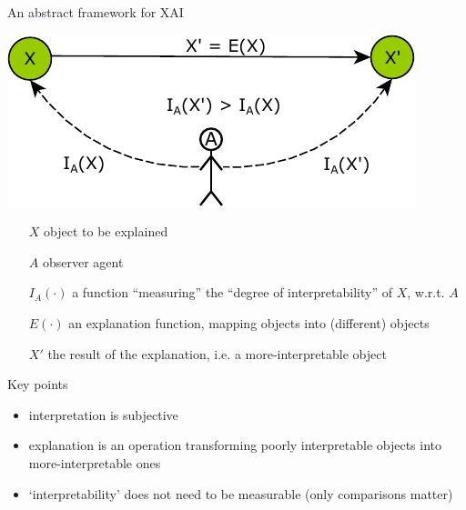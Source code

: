 \documentclass[presentation]{beamer}\mode<presentation>{\usetheme{AMSBolognaFC}}
\begin{document}
\begin{frame}[allowframebreaks]{An abstract framework for XAI}

    \begin{center}
        \includegraphics[width=.5\linewidth]{figures/framework.pdf}
    \end{center}
    \begin{itemize}
        \item[$X$] object to be explained
        \item[$A$] observer agent
        \item[$I_A(\cdot)$] a function ``measuring'' the ``degree of interpretability'' of $X$, w.r.t. $A$
        \item[$E(\cdot)$] an \alert{explanation} function, mapping objects into (different) objects      
        \item[$X'$] the \alert{result} of the explanation, i.e. a \alert{more-interpretable} object
    \end{itemize}
    
    \begin{block}{Key points}
        \begin{itemize}
            \item interpretation is \alert{subjective}
            \item explanation is an operation transforming poorly interpretable objects into more-interpretable ones
            \item `interpretability' does not need to be measurable (only comparisons matter)
        \end{itemize}
    \end{block}

    \framebreak


\end{frame}
\end{document}
